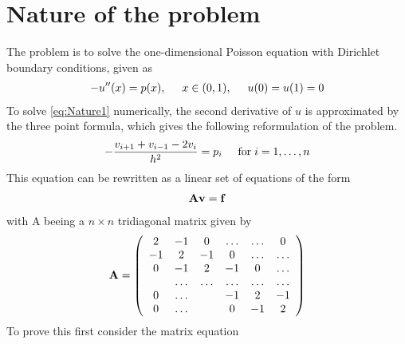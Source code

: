 \section{Nature of the problem}
\label{sec:NatureOfTheProblem}
The problem is to solve the one-dimensional Poisson equation with Dirichlet boundary conditions, given as
\begin{align}
	-u''(x) = p(x), \hspace{0.5cm} x\in(0,1), \hspace{0.5cm} u(0) = u(1) = 0
	\label{eq:Nature1}
\end{align}
To solve \eqref{eq:Nature1} numerically, the second derivative of $u$ is approximated by the three point formula, which gives the following reformulation of the problem.
\begin{align}
	-\frac{v_{i+1}+v_{i-1}-2v_i}{h^2} = p_i  \hspace{0.5cm} \mathrm{for} \hspace{0.1cm} i=1,\dots, n
	\label{eq:Nature2}
\end{align}
This equation can be rewritten as a linear set of equations of the form
\begin{align}
	\mbox{\textbf{A}}\mbox{\textbf{v}} = \mbox{\textbf{f}}
	\label{eq:Nature3}
\end{align}
with A beeing a $n \times n$ tridiagonal matrix given by
\begin{align}
	\mbox{\textbf{A}} = \left(\begin{array}{cccccc}
                           2& -1& 0 &\dots   & \dots &0 \\
                           -1 & 2 & -1 &0 &\dots &\dots \\
                           0&-1 &2 & -1 & 0 & \dots \\
                           & \dots   & \dots &\dots   &\dots & 									\dots \\
                           0&\dots   &  &-1 &2& -1 \\
                           0&\dots    &  & 0  &-1 & 2 \\
                      \end{array} \right)
	\label{eq:Nature4}
\end{align}
To prove this first consider the matrix equation
